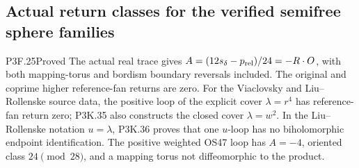 \subsection{Actual return classes for the verified semifree sphere families}
\begin{statement}{P3F.25}{Proved}
The actual real trace gives $A=(12s_\delta-p_{\rm rel})/24=-R\cdot O$, with both mapping-torus and bordism boundary reversals included. The original and coprime higher reference-fan returns are zero. For the Viaclovsky and Liu--Rollenske source data, the positive loop of the explicit cover $\lambda=r^4$ has reference-fan return zero; P3K.35 also constructs the closed cover $\lambda=w^2$. In the Liu--Rollenske notation $u=\lambda$, P3K.36 proves that one $u$-loop has no biholomorphic endpoint identification. The positive weighted OS47 loop has $A=-4$, oriented class $24\pmod{28}$, and a mapping torus not diffeomorphic to the product.
\end{statement}
